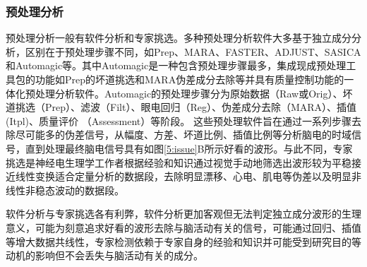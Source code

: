 \subsubsection{预处理分析}
预处理分析一般有软件分析和专家挑选。多种预处理分析软件大多基于独立成分分析，区别在于预处理步骤不同，如Prep、MARA、FASTER、ADJUST、SASICA和Automagic等。其中Automagic是一种包含预处理步骤最多，集成现成预处理工具包的功能如Prep的坏道挑选和MARA伪差成分去除等并具有质量控制功能的一体化预处理分析软件。Automagic的预处理步骤分为原始数据（Raw或Orig）、坏道挑选（Prep）、滤波（Filt）、眼电回归（Reg）、伪差成分去除（MARA）、插值(Itpl)、质量评价
（Assessment）等阶段。 这些预处理软件旨在通过一系列步骤去除尽可能多的伪差信号，从幅度、方差、坏道比例、插值比例等分析脑电的时域信号，直到处理最终脑电信号具有如图\ref{5:issue}B所示好看的波形。与此不同，专家挑选是神经电生理学工作者根据经验和知识通过视觉手动地筛选出波形较为平稳接近线性变换适合定量分析的数据段，去除明显漂移、心电、肌电等伪差以及明显非线性非稳态波动的数据段。

软件分析与专家挑选各有利弊，软件分析更加客观但无法判定独立成分波形的生理意义，可能为刻意追求好看的波形去除与脑活动有关的信号，可能通过回归、插值等增大数据共线性，专家检测依赖于专家自身的经验和知识并可能受到研究目的等动机的影响但不会丢失与脑活动有关的成分。

